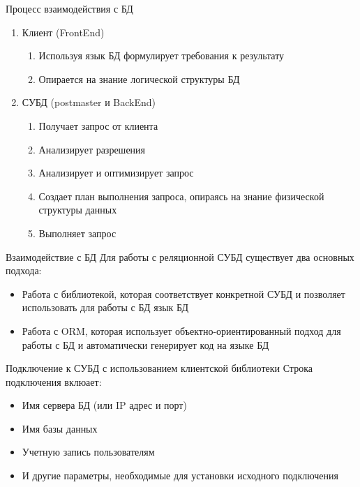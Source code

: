 \documentclass[12pt]{article}
\begin{document}
\begin{nota}{Процесс взаимодействия с БД}
    \begin{enumerate}
        \item Клиент (FrontEnd)
        
        \begin{enumerate}
            \item Используя язык БД формулирует требования к результату
            \item Опирается на знание логической структуры БД
        \end{enumerate}

        \item СУБД (postmaster и BackEnd)
        
        \begin{enumerate}
            \item Получает запрос от клиента 
            \item Анализирует разрешения
            \item Анализирует и оптимизирует запрос 
            \item Создает план выполнения запроса, опираясь на знание физической структуры данных
            \item Выполняет запрос 
        \end{enumerate}
    \end{enumerate}
\end{nota}

\begin{nota}{Взаимодействие с БД}
    Для работы с реляционной СУБД существует два основных подхода:

    \begin{itemize}
        \item Работа с библиотекой, которая соответствует конкретной СУБД и позволяет использовать для работы с БД язык БД 
        \item Работа с ORM, которая использует объектно-ориентированный подход для работы с БД и автоматически генерирует код на языке БД 
    \end{itemize}
\end{nota}

\begin{nota}{Подключение к СУБД с использованием клиентской библиотеки}
    Строка подключения вклюает:

    \begin{itemize}
        \item Имя сервера БД (или IP адрес и порт)
        \item Имя базы данных
        \item Учетную запись пользователям
        \item И другие параметры, необходимые для установки исходного подключения 
    \end{itemize}
\end{nota}
\end{document}
